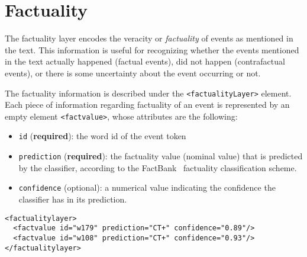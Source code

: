 \section{Factuality}
\label{sec:factuality}

The factuality layer encodes the veracity or \emph{factuality} of events as
mentioned in the text. This information is useful for recognizing whether
the events mentioned in the text actually happened (factual events), did not
happen (contrafactual events), or there is some uncertainty about the event
occurring or not.

The factuality information is described under the \texttt{<factualityLayer>}
element. Each piece of information regarding factuality of an event is
represented by an empty element \texttt{<factvalue>}, whose attributes are
the following:

\begin{itemize}
\item \texttt{id} (\textbf{required}): the word id of the event token
\item \texttt{prediction} (\textbf{required}): the factuality value (nominal
  value) that is predicted by the classifier, according to the
  FactBank~\cite{sauri2009factbank} factuality classification scheme.
\item \texttt{confidence} (optional): a numerical value indicating the
  confidence the classifier has in its prediction.
\end{itemize}

\begin{Verbatim}
<factualitylayer>
  <factvalue id="w179" prediction="CT+" confidence="0.89"/>
  <factvalue id="w108" prediction="CT+" confidence="0.93"/>
</factualitylayer>
\end{Verbatim}



